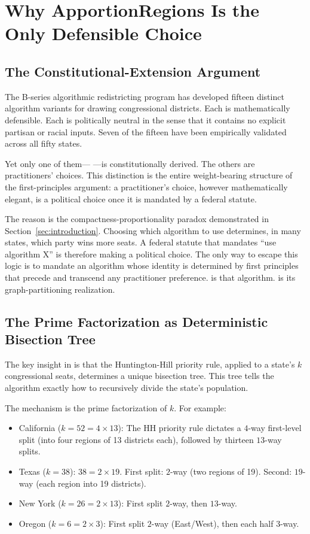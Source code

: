 \section{Why ApportionRegions Is the Only Defensible Choice}
\label{sec:why-apportionregions}

\subsection{The Constitutional-Extension Argument}

The B-series algorithmic redistricting program \citep{b0paper} has developed
fifteen distinct algorithm variants for drawing congressional districts.
Each is mathematically defensible.
Each is politically neutral in the sense that it contains no explicit
partisan or racial inputs.
Seven of the fifteen have been empirically validated across all fifty states.

Yet only one of them---\ar{} \citep{b11paper}---is constitutionally derived.
The others are practitioners' choices.
This distinction is the entire weight-bearing structure of the first-principles
argument: a practitioner's choice, however mathematically elegant, is a
political choice once it is mandated by a federal statute.

The reason is the compactness-proportionality paradox demonstrated in
Section~\ref{sec:introduction}.
Choosing which algorithm to use determines, in many states, which party wins
more seats.
A federal statute that mandates ``use algorithm X'' is therefore making a
political choice.
The only way to escape this logic is to mandate an algorithm whose identity
is determined by first principles that precede and transcend any practitioner
preference.
\hh{} is that algorithm.
\ar{} is its graph-partitioning realization.

\subsection{The Prime Factorization as Deterministic Bisection Tree}

The key insight in \ar{} \citep{b11paper} is that the Huntington-Hill priority
rule, applied to a state's $k$ congressional seats, determines a unique
bisection tree.
This tree tells the algorithm exactly how to recursively divide the state's
population.

The mechanism is the prime factorization of $k$.
For example:
\begin{itemize}
  \item California ($k = 52 = 4 \times 13$): The HH priority rule dictates
    a $4$-way first-level split (into four regions of 13 districts each),
    followed by thirteen $13$-way splits.
  \item Texas ($k = 38$): $38 = 2 \times 19$.
    First split: $2$-way (two regions of 19).
    Second: $19$-way (each region into 19 districts).
  \item New York ($k = 26 = 2 \times 13$): First split $2$-way, then $13$-way.
  \item Oregon ($k = 6 = 2 \times 3$): First split $2$-way (East/West),
    then each half $3$-way.
\end{itemize}

